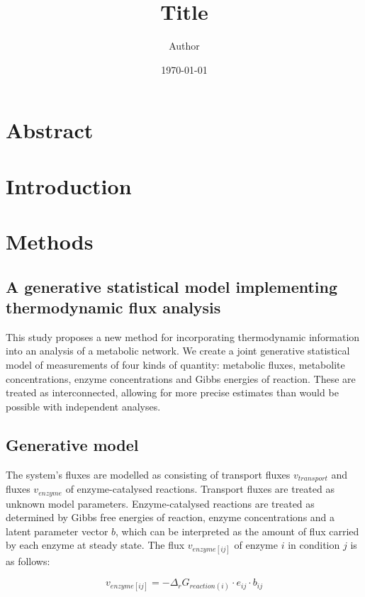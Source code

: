 \documentclass[11pt]{article}
\title{ Title}
\author{ Author }
\date{\today}
\begin{document}
	\maketitle	
	\pagebreak
	

\section{Abstract}

\section{Introduction}

\section{Methods}	
\subsection{A generative statistical model implementing thermodynamic flux analysis}

This study proposes a new method for incorporating thermodynamic information
into an analysis of a metabolic network. We create a joint generative
statistical model of measurements of four kinds of quantity: metabolic fluxes,
metabolite concentrations, enzyme concentrations and Gibbs energies of
reaction. These are treated as interconnected, allowing for more precise
estimates than would be possible with independent analyses.

\subsection{Generative model}

The system's fluxes are modelled as consisting of transport fluxes
$v_{transport}$ and fluxes $v_{enzyme}$ of enzyme-catalysed
reactions. Transport fluxes are treated as unknown model
parameters. Enzyme-catalysed reactions are treated as determined by Gibbs free
energies of reaction, enzyme concentrations and a latent parameter vector $b$,
which can be interpreted as the amount of flux carried by each enzyme at steady
state. The flux $v_{enzyme[ij]}$ of enzyme $i$ in condition $j$ is as follows:

\[
v_{enzyme[ij]} = -\Delta_rG_{reaction(i)} \cdot e_{ij} \cdot b_{ij}
\]
\end{document}

